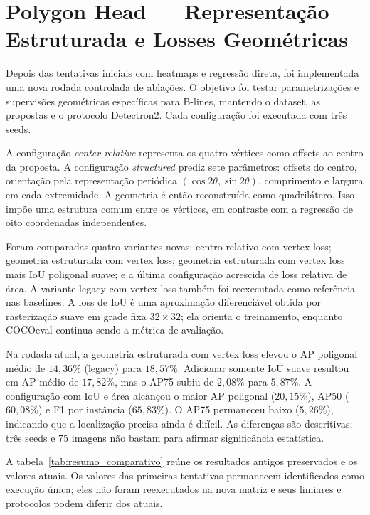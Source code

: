 \documentclass[11pt]{article}
\begin{document}
\section{Polygon Head --- Representação Estruturada e Losses Geométricas}
\label{sec:polygon_ablation}

Depois das tentativas iniciais com heatmaps e regressão direta, foi implementada
uma nova rodada controlada de ablações. O objetivo foi testar parametrizações e
supervisões geométricas específicas para B-lines, mantendo o dataset, as propostas
e o protocolo Detectron2. Cada configuração foi executada com três seeds.

A configuração \textit{center-relative} representa os quatro vértices como offsets
ao centro da proposta. A configuração \textit{structured} prediz sete parâmetros:
offsets do centro, orientação pela representação periódica
$(\cos 2\theta,\sin 2\theta)$, comprimento e largura em cada extremidade. A
geometria é então reconstruída como quadrilátero. Isso impõe uma estrutura comum
entre os vértices, em contraste com a regressão de oito coordenadas independentes.

Foram comparadas quatro variantes novas: centro relativo com vertex loss;
geometria estruturada com vertex loss; geometria estruturada com vertex loss mais
IoU poligonal suave; e a última configuração acrescida de loss relativa de área.
A variante legacy com vertex loss também foi reexecutada como referência nas
baselines. A loss de IoU é uma aproximação diferenciável obtida por rasterização
suave em grade fixa $32\times32$; ela orienta o treinamento, enquanto COCOeval
continua sendo a métrica de avaliação.

Na rodada atual, a geometria estruturada com vertex loss elevou o AP poligonal
médio de $14,36\%$ (legacy) para $18,57\%$. Adicionar somente IoU suave resultou
em AP médio de $17,82\%$, mas o AP75 subiu de $2,08\%$ para $5,87\%$. A
configuração com IoU e área alcançou o maior AP poligonal ($20,15\%$), AP50
($60,08\%$) e F1 por instância ($65,83\%$). O AP75 permaneceu baixo
($5,26\%$), indicando que a localização precisa ainda é difícil. As diferenças
são descritivas; três seeds e 75 imagens não bastam para afirmar significância
estatística.

A tabela~\ref{tab:resumo_comparativo} reúne os resultados antigos preservados e
os valores atuais. Os valores das primeiras tentativas permanecem identificados
como execução única; eles não foram reexecutados na nova matriz e seus limiares e
protocolos podem diferir dos atuais.
\end{document}
